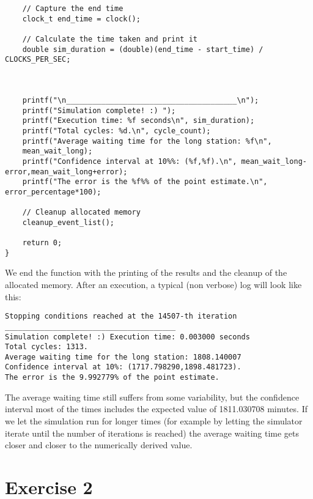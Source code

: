 \documentclass[12pt]{article}
\begin{document}
\begin{lstlisting}
	// Capture the end time
	clock_t end_time = clock();
	
	// Calculate the time taken and print it
	double sim_duration = (double)(end_time - start_time) / CLOCKS_PER_SEC;
	
	
	
	printf("\n_______________________________________\n");
	printf("Simulation complete! :) ");
	printf("Execution time: %f seconds\n", sim_duration);
	printf("Total cycles: %d.\n", cycle_count);
	printf("Average waiting time for the long station: %f\n",
	mean_wait_long);
	printf("Confidence interval at 10%%: (%f,%f).\n", mean_wait_long-error,mean_wait_long+error);
	printf("The error is the %f%% of the point estimate.\n", error_percentage*100);
	
	// Cleanup allocated memory
	cleanup_event_list();
	
	return 0;
}
\end{lstlisting}
We end the function with the printing of the results and the cleanup of the allocated memory. After an execution, a typical (non verbose) log will look like this:
\begin{verbatim}
Stopping conditions reached at the 14507-th iteration
_______________________________________
Simulation complete! :) Execution time: 0.003000 seconds
Total cycles: 1313.
Average waiting time for the long station: 1808.140007
Confidence interval at 10%: (1717.798290,1898.481723).
The error is the 9.992779% of the point estimate.
\end{verbatim}
The average waiting time still suffers from some variability, but the confidence interval most of the times includes the expected value of 1811.030708 minutes. If we let the simulation run for longer times (for example by letting the simulator iterate until the  number of iterations is reached) the average waiting time gets closer and closer to the numerically derived value.
\section{Exercise 2}
\end{document}
